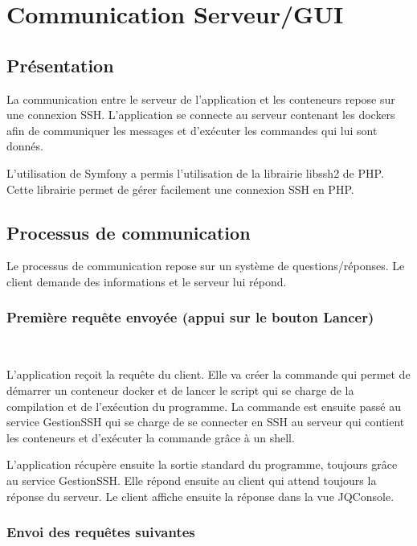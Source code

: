 \section{Communication Serveur/GUI}

\subsection{Présentation}

\par La communication entre le serveur de l'application et les conteneurs repose sur une connexion SSH. L'application se connecte au serveur contenant les dockers afin de communiquer les messages et d'exécuter les commandes qui lui sont donnés.

\par L'utilisation de Symfony a permis l'utilisation de la librairie libssh2 de PHP. Cette librairie permet de gérer facilement une connexion SSH en PHP.

\subsection{Processus de communication}

\par Le processus de communication repose sur un système de questions/réponses. Le client demande des informations et le serveur lui répond.

\subsubsection{Première requête envoyée (appui sur le bouton Lancer)} \

\par L'application reçoit la requête du client. Elle va créer la commande qui permet de démarrer un conteneur docker et de lancer le script qui se charge de la compilation et de l'exécution du programme. La commande est ensuite passé au service GestionSSH qui se charge de se connecter en SSH au serveur qui contient les conteneurs et d'exécuter la commande grâce à un shell. 

\par L'application récupère ensuite la sortie standard du programme, toujours grâce au service GestionSSH. Elle répond ensuite au client qui attend toujours la réponse du serveur. Le client affiche ensuite la réponse dans la vue JQConsole.

\subsubsection{Envoi des requêtes suivantes} \

